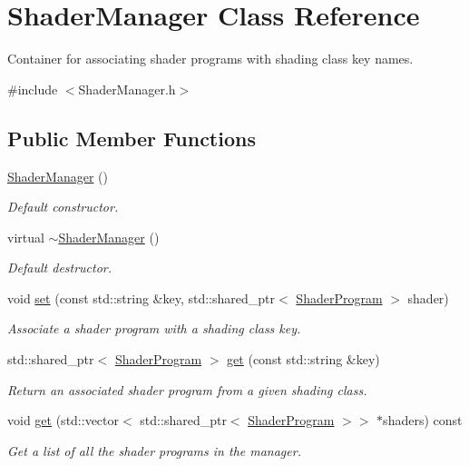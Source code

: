 \hypertarget{class_shader_manager}{}\section{Shader\+Manager Class Reference}
\label{class_shader_manager}


Container for associating shader programs with shading class key names.  




{\ttfamily \#include $<$Shader\+Manager.\+h$>$}

\subsection*{Public Member Functions}
\begin{DoxyCompactItemize}
\item 
\hyperlink{class_shader_manager_aca25f81fd10a02b3e97e9c459b864186}{Shader\+Manager} ()
\begin{DoxyCompactList}\small\item\em Default constructor. \end{DoxyCompactList}\item 
virtual \hyperlink{class_shader_manager_a7603399f16432b94223b9fa78f74fb87}{$\sim$\+Shader\+Manager} ()
\begin{DoxyCompactList}\small\item\em Default destructor. \end{DoxyCompactList}\item 
void \hyperlink{class_shader_manager_a9a39a329a279db43c84fce10fee9a706}{set} (const std\+::string \&key, std\+::shared\+\_\+ptr$<$ \hyperlink{class_shader_program}{Shader\+Program} $>$ shader)
\begin{DoxyCompactList}\small\item\em Associate a shader program with a shading class key. \end{DoxyCompactList}\item 
std\+::shared\+\_\+ptr$<$ \hyperlink{class_shader_program}{Shader\+Program} $>$ \hyperlink{class_shader_manager_a42a3df3ac4d2bce3153fff3d967fd97f}{get} (const std\+::string \&key)
\begin{DoxyCompactList}\small\item\em Return an associated shader program from a given shading class. \end{DoxyCompactList}\item 
void \hyperlink{class_shader_manager_a8288a4814f4a4fd228262ea3bef18673}{get} (std\+::vector$<$ std\+::shared\+\_\+ptr$<$ \hyperlink{class_shader_program}{Shader\+Program} $>$$>$ $\ast$shaders) const 
\begin{DoxyCompactList}\small\item\em Get a list of all the shader programs in the manager. \end{DoxyCompactList}\end{DoxyCompactItemize}

